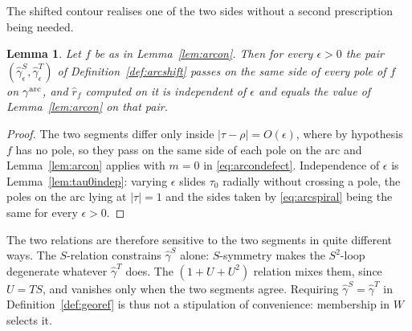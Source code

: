\documentclass[11pt]{article}
\newtheorem{lemma}[theorem]{Lemma}
\begin{document}
The shifted contour realises one of the two sides without a second prescription being needed.

\begin{lemma}\label{lem:arcdeform}
Let $f$ be as in Lemma~\ref{lem:arcon}. Then for every $\epsilon>0$ the pair
$(\hat\gamma^S_\epsilon,\hat\gamma^T_\epsilon)$ of Definition~\ref{def:arcshift} passes on the
same side of every pole of $f$ on $\gamma^{\rm arc}$, and $\hat r_f$ computed on it is
independent of $\epsilon$ and equals the value of Lemma~\ref{lem:arcon} on that pair.
\end{lemma}

\begin{proof}
The two segments differ only inside $|\tau-\rho|=O(\epsilon)$, where by hypothesis $f$ has no
pole, so they pass on the same side of each pole on the arc and Lemma~\ref{lem:arcon} applies with
$m=0$ in \eqref{eq:arcondefect}. Independence of $\epsilon$ is Lemma~\ref{lem:tau0indep}: varying
$\epsilon$ slides $\tau_0$ radially without crossing a pole, the poles on the arc lying at
$|\tau|=1$ and the sides taken by \eqref{eq:arcspiral} being the same for every $\epsilon>0$.
\end{proof}

The two relations are therefore sensitive to the two segments in quite different ways. The
$S$-relation constrains $\hat\gamma^S$ alone: $S$-symmetry makes the $S^2$-loop degenerate whatever
$\hat\gamma^T$ does. The $(1+U+U^2)$ relation mixes them, since $U=TS$, and vanishes only when the
two segments agree. Requiring $\hat\gamma^S=\hat\gamma^T$ in Definition~\ref{def:georef} is thus not
a stipulation of convenience: membership in $W$ selects it.
\end{document}
